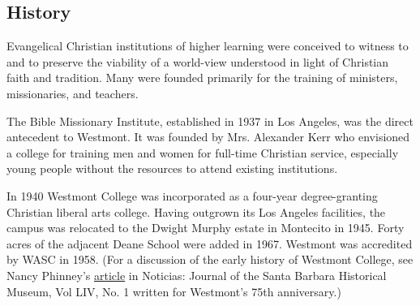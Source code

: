 \subsection{History}

   Evangelical Christian institutions of higher learning were conceived to
   witness to and to preserve the viability of a world-view understood in light
   of Christian faith and tradition. Many were founded primarily for the
   training of ministers, missionaries, and teachers.

   The Bible Missionary Institute, established in 1937 in Los Angeles, was the
   direct antecedent to Westmont. It was founded by Mrs. Alexander Kerr who
   envisioned a college for training men and women for full-time Christian
   service, especially young people without the resources to attend existing
   institutions.

   In 1940 Westmont College was incorporated as a four-year degree-granting
   Christian liberal arts college. Having outgrown its Los Angeles facilities,
   the campus was relocated to the Dwight Murphy estate in Montecito in 1945.
   Forty acres of the adjacent Deane School were added in 1967. Westmont was
   accredited by WASC in 1958. (For a discussion of the early history of
   Westmont College, see Nancy Phinney's
   \href{http://www.santabarbaramuseum.com/noticias-article.pdf}{article} in
   Noticias: Journal of the Santa Barbara Historical Museum, Vol LIV, No. 1
   written for Westmont's 75th anniversary.)
   
